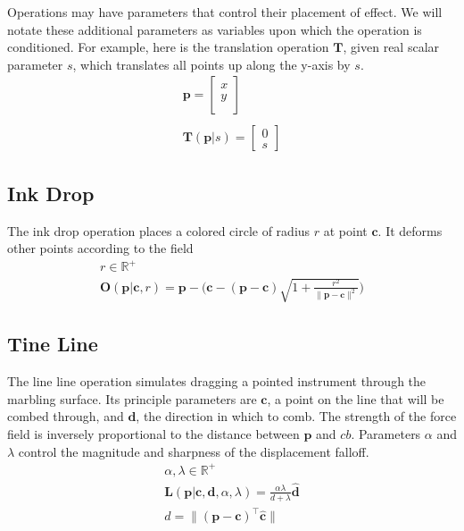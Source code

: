 \documentclass{article}
\newcommand{\cb}{\boldsymbol{c}}
\newcommand{\db}{\boldsymbol{d}}
\newcommand{\pb}{\boldsymbol{p}}
\newcommand{\Tb}{\boldsymbol{T}}
\begin{document}
Operations may have parameters that control their placement of effect. We will notate these additional parameters as variables upon which the operation is conditioned. For example, here is the translation operation $\Tb$, given real scalar parameter $s$, which translates all points up along the y-axis by $s$. 
\begin{gather*}
			\pb = \begin{bmatrix}
	x \\
	y\\
	\end{bmatrix}\\
	\\
	\Tb(\pb | s) = \begin{bmatrix}
	0 \\
	s
	\end{bmatrix}
\end{gather*}

\subsection{Ink Drop}

The ink drop operation places a colored circle of radius $r$ at point $\cb$. It deforms other points according to the field 
\begin{gather*}
	r \in \mathbb{R}^+\\
	\boldsymbol{O}(\pb | \cb, r) =  \pb - \Bigg(\cb - (\pb - \cb )\sqrt{1 + \frac{r^2}{\lVert\pb - \cb\rVert^2}}\Bigg)
\end{gather*}

\subsection{Tine Line}
The line line operation simulates dragging a pointed instrument through the marbling surface. Its principle parameters are $\cb$, a point on the line that will be combed through, and $\db$, the direction in which to comb. The strength of the force field is inversely proportional to the distance between $\pb$ and $cb$. Parameters $\alpha$ and $\lambda$ control the magnitude and sharpness of the displacement falloff. 
\begin{gather*} 
	\alpha, \lambda \in \mathbb{R}^+\\
	\boldsymbol{L}(\pb | \cb, \db, \alpha, \lambda) = \frac{\alpha\lambda}{d + \lambda}\hat{\db} \\	
    d = \lVert(\pb - \cb) ^ \top \hat{\cb}\rVert
\end{gather*}
\end{document}
